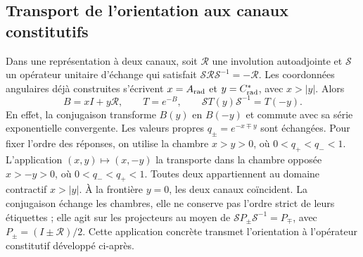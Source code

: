 \subsection{Transport de l’orientation aux canaux constitutifs}

Dans une représentation à deux canaux, soit $\mathcal R$ une involution
autoadjointe et $\mathcal S$ un opérateur unitaire d’échange qui satisfait
$\mathcal S\mathcal R\mathcal S^{-1}=-\mathcal R$. Les coordonnées angulaires
déjà construites s’écrivent $x=A_{\rm rad}$ et $y=C^*_{\rm rad}$, avec $x>|y|$.
Alors
\begin{equation}
 B=xI+y\mathcal R,\qquad T=e^{-B},\qquad
 \mathcal ST(y)\mathcal S^{-1}=T(-y).
 \label{iii:iii:eq:channel-conjugation}
\end{equation}
En effet, la conjugaison transforme $B(y)$ en $B(-y)$ et commute avec sa série
exponentielle convergente. Les valeurs propres $q_\pm=e^{-x\mp y}$ sont échangées.
Pour fixer l’ordre des réponses, on utilise la chambre $x>y>0$, où
$0<q_+<q_-<1$. L’application $(x,y)\mapsto(x,-y)$ la transporte dans la
chambre opposée $x>-y>0$, où $0<q_-<q_+<1$. Toutes deux appartiennent au domaine
contractif $x>|y|$. À la frontière $y=0$, les deux canaux coïncident.
La conjugaison échange les chambres, elle ne conserve pas l’ordre strict de
leurs étiquettes ; elle agit sur les projecteurs au moyen de
$\mathcal SP_\pm\mathcal S^{-1}=P_\mp$, avec
$P_\pm=(I\pm\mathcal R)/2$.
Cette application concrète transmet l’orientation à l’opérateur constitutif
développé ci-après.

